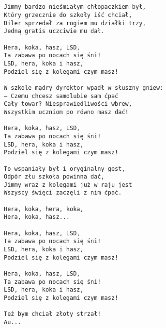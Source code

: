 \documentclass[12pt]{article}
\begin{document}
\subsection*{}
\begin{verbatim}
Jimmy bardzo nieśmiałym chłopaczkiem był,
Który grzecznie do szkoły iść chciał,
Diler sprzedał za rogiem mu działki trzy,
Jedną gratis uczciwie mu dał.

Hera, koka, hasz, LSD,
Ta zabawa po nocach się śni!
LSD, hera, koka i hasz,
Podziel się z kolegami czym masz!

W szkole mądry dyrektor wpadł w słuszny gniew:
– Czemu chcesz samolubie sam ćpać
Cały towar? Niesprawiedliwości wbrew,
Wszystkim uczniom po równo masz dać!

Hera, koka, hasz, LSD,
Ta zabawa po nocach się śni!
LSD, hera, koka i hasz,
Podziel się z kolegami czym masz!

To wspaniały był i oryginalny gest,
Odpór złu szkoła powinna dać,
Jimmy wraz z kolegami już w raju jest
Wszyscy święci zaczęli z nim ćpać.

Hera, koka, hera, koka,
Hera, koka, hasz...

Hera, koka, hasz, LSD,
Ta zabawa po nocach się śni!
LSD, hera, koka i hasz,
Podziel się z kolegami czym masz!

Hera, koka, hasz, LSD,
Ta zabawa po nocach się śni!
LSD, hera, koka i hasz,
Podziel się z kolegami czym masz!

Też bym chciał złoty strzał!
Au...
\end{verbatim}
\clearpage
\end{document}

